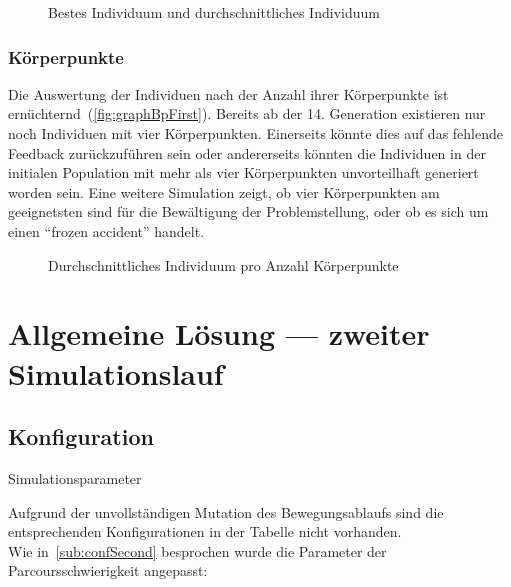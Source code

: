       \begin{figure}[H]
        \centering
        
        \caption{Bestes Individuum und durchschnittliches Individuum\label{fig:graphFirst}}
      \end{figure}

      \subsubsection{Körperpunkte\label{subsub:bp}}

        Die Auswertung der Individuen nach der Anzahl ihrer Körperpunkte ist ernüchternd~(\vref{fig:graphBpFirst}).
        Bereits ab der 14. Generation existieren nur noch Individuen mit vier Körperpunkten.
        Einerseits könnte dies auf das fehlende Feedback zurückzuführen sein oder andererseits
        könnten die Individuen in der initialen Population mit mehr als vier Körperpunkten unvorteilhaft generiert worden sein.
        Eine weitere Simulation zeigt,
        ob vier Körperpunkten am geeignetsten sind für die Bewältigung der Problemstellung,
        oder ob es sich um einen ``frozen accident'' handelt.

        \begin{figure}[H]
          \centering
          
          \caption{Durchschnittliches Individuum pro Anzahl Körperpunkte\label{fig:graphBpFirst}}
        \end{figure}

  \section{Allgemeine Lösung --- zweiter Simulationslauf}

    \subsection{Konfiguration}

      \begin{table}[H]
        \centering
        
        \caption{Simulationsparameter}
      \end{table}

      Aufgrund der unvollständigen Mutation des Bewegungsablaufs sind die entsprechenden
      Konfigurationen in der Tabelle nicht vorhanden.
      \\
      Wie in~\vref{sub:confSecond} besprochen wurde die Parameter der Parcoursschwierigkeit angepasst:

